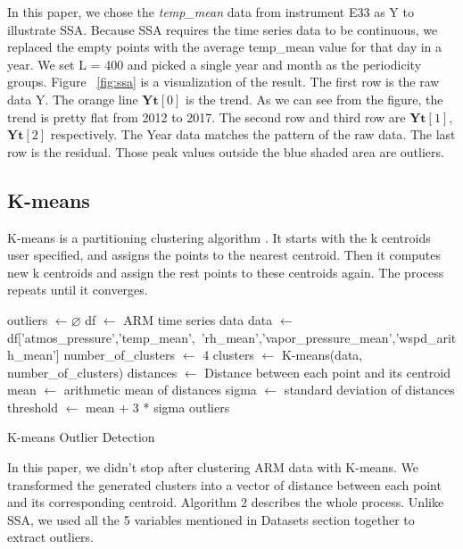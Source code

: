 \documentclass[letterpaper, 10 pt, conference]{ieeeconf}  %
\begin{document}
In this paper, we chose the \textit{temp\_mean} data from instrument E33 as Y to illustrate SSA. Because SSA requires the time series data to be continuous, we replaced the empty points with the average temp\_mean value for that day in a year. We set L = 400 and picked a single year and month as the periodicity groups. Figure~ \ref{fig:ssa} is a visualization of the result. The first row is the raw data Y. The orange line $\mathbf{Yt}[0]$ is the trend. As we can see from the figure, the trend is pretty flat from 2012 to 2017. The second row and third row are $\mathbf{Yt}[1]$, $\mathbf{Yt}[2]$ respectively. The Year data matches the pattern of the raw data. The last row is the residual. Those peak values outside the blue shaded area are outliers.

\subsection{K-means}
K-means is a partitioning clustering algorithm \cite{macqueen1967some, hartigan1979algorithm}. It starts with the k centroids user specified, and assigns the points to the nearest centroid. Then it computes new k centroids and assign the rest points to these centroids again. The process repeats until it converges. 

\begin{algorithm}[ht]
\DontPrintSemicolon
\SetAlgoLined
\BlankLine

outliers $\leftarrow \varnothing$\;
df $\leftarrow$ ARM time series data\;
data $\leftarrow$ df['atmos\_pressure','temp\_mean',\
'rh\_mean','vapor\_pressure\_mean','wspd\_arith\_mean']\;
number\_of\_clusters $\leftarrow$ 4\;
clusters $\leftarrow$ K-means(data, number\_of\_clusters)\;
distances $\leftarrow$ Distance between each point and its centroid\;
mean $\leftarrow$ arithmetic mean of distances\;
sigma $\leftarrow$ standard deviation of distances\;
threshold $\leftarrow$ mean + 3 * sigma\;
\Return outliers
\caption{K-means Outlier Detection}
\end{algorithm}

In this paper, we didn't stop after clustering ARM data with K-means. We transformed the generated clusters into a vector of distance between each point and its corresponding centroid. Algorithm 2 describes the whole process. Unlike SSA, we used all the 5 variables mentioned in Datasets section together to extract outliers.
\end{document}
